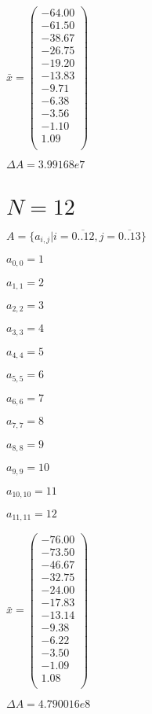 \documentclass[a4paper,12pt]{article}
\begin{document}
$\bar { x } = \begin{pmatrix}
-64.00 \\
-61.50 \\
-38.67 \\
-26.75 \\
-19.20 \\
-13.83 \\
-9.71 \\
-6.38 \\
-3.56 \\
-1.10 \\
1.09 \\
\end{pmatrix}
$

$\Delta A = 3.99168e7$



\section{ $N = 12$ }
$A = \{ a _{ i, j } | i = \overline { 0..12 }, j = \overline { 0..13 } \}$

$a _{ 0, 0 } = 1$

$a _{ 1, 1 } = 2$

$a _{ 2, 2 } = 3$

$a _{ 3, 3 } = 4$

$a _{ 4, 4 } = 5$

$a _{ 5, 5 } = 6$

$a _{ 6, 6 } = 7$

$a _{ 7, 7 } = 8$

$a _{ 8, 8 } = 9$

$a _{ 9, 9 } = 10$

$a _{ 10, 10 } = 11$

$a _{ 11, 11 } = 12$

$\bar { x } = \begin{pmatrix}
-76.00 \\
-73.50 \\
-46.67 \\
-32.75 \\
-24.00 \\
-17.83 \\
-13.14 \\
-9.38 \\
-6.22 \\
-3.50 \\
-1.09 \\
1.08 \\
\end{pmatrix}
$

$\Delta A = 4.790016e8$
\end{document}
